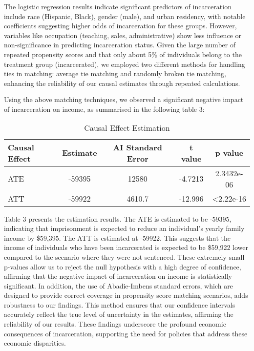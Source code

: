 \documentclass{article}[12pt]
\begin{document}
The logistic regression results indicate significant predictors of incarceration include race (Hispanic, Black), gender (male), and urban residency, with notable coefficients suggesting higher odds of incarceration for these groups. However, variables like occupation (teaching, sales, administrative) show less influence or non-significance in predicting incarceration status.
Given the large number of repeated propensity scores and that only about 5\% of individuals belong to the treatment group (incarcerated), we employed two different methods for handling ties in matching: average tie matching and randomly broken tie matching, enhancing the reliability of our causal estimates through repeated calculations. %

 \par
Using the above matching techniques, we observed a significant negative impact of incarceration on income, as summarised in the following table 3:
\par
\begin{table}[htbp]
    \centering
    \caption{Causal Effect Estimation}
    \label{tab: Causal Effect Estimation}
    \begin{tabular}{lcccc}
        \toprule
         \textbf{Causal Effect} & \textbf{Estimate} & \textbf{AI Standard Error} & \textbf{t value} & \textbf{p value} \\ 
        \midrule
         ATE & -59395 & 12580 & -4.7213 & 2.3432e-06  \\
         ATT & -59922 & 4610.7 & -12.996 & \textless 2.22e-16 \\
        \bottomrule
    \end{tabular}
\end{table}
Table 3 presents the estimation results. The ATE is estimated to be -59395, indicating that imprisonment is expected to reduce an individual’s yearly family income by \$59,395. The ATT is estimated at -59922. This suggests that the income of individuals who have been incarcerated is expected to be \$59,922 lower compared to the scenario where they were not sentenced. These extremely small p-values allow us to reject the null hypothesis with a high degree of confidence, affirming that the negative impact of incarceration on income is statistically significant. In addition, the use of Abadie-Imbens standard errors, which are designed to provide correct coverage in propensity score matching scenarios, adds robustness to our findings. This method ensures that our confidence intervals accurately reflect the true level of uncertainty in the estimates, affirming the reliability of our results. These findings underscore the profound economic consequences of incarceration, supporting the need for policies that address these economic disparities. \par
\end{document}
